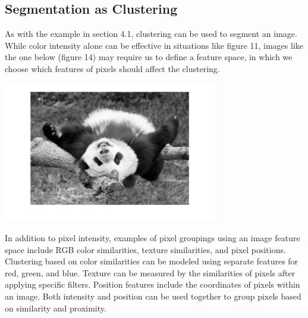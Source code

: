 \documentclass{article}
\begin{document}
\subsection{Segmentation as Clustering}
As with the example in section 4.1, clustering can be used to segment an image. While color intensity alone can be effective in situations like figure 11, images like the one below (figure 14) may require us to define a feature space, in which we choose which features of pixels should affect the clustering.

\begin{minipage}{\linewidth}
\begin{center}
\includegraphics[width=0.70\textwidth]{panda.jpg}
\end{center}
\end{minipage}

In addition to pixel intensity, examples of pixel groupings using an image feature space include RGB color similarities, texture similarities, and pixel positions. Clustering based on color similarities can be modeled using separate features for red, green, and blue. Texture can be measured by the similarities of pixels after applying specific filters. Position features include the coordinates of pixels within an image. Both intensity and position can be used together to group pixels based on similarity and proximity.
\end{document}
